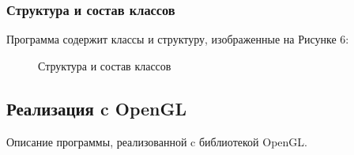 \documentclass[14pt, a4paper]{extarticle}
\begin{document}
	\subsubsection{Структура и состав классов}
	Программа содержит классы и структуру, изображенные на Рисунке 6:
	\begin{figure}[h!]
		\caption{Структура и состав классов}
	\end{figure}	
	\clearpage
	
	\subsection{Реализация c OpenGL}
	Описание программы, реализованной c библиотекой OpenGL.
	
\end{document}
